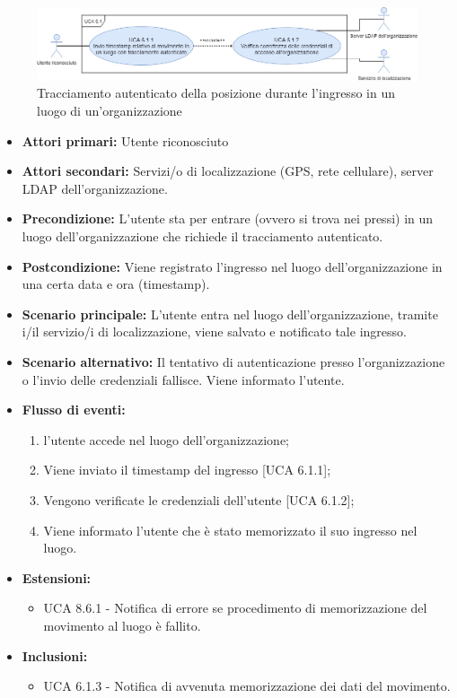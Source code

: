 \begin{figure}[h]
	\centering
	\includegraphics[scale=0.4, center]{sezioni/UseCase/Immagini/UCA6.1.png}
	\caption{Tracciamento autenticato della posizione durante l'ingresso in un luogo di un'organizzazione}
\end{figure}

\begin{itemize}
	\item \textbf{Attori primari:} Utente riconosciuto
	\item \textbf{Attori secondari:} Servizi/o di localizzazione (GPS, rete cellulare), server LDAP dell'organizzazione.
	\item \textbf{Precondizione:} L'utente sta per entrare (ovvero si trova nei pressi) in un luogo dell'organizzazione che richiede il tracciamento autenticato.
	\item \textbf{Postcondizione:} Viene registrato l'ingresso nel luogo dell'organizzazione in una certa data e ora (timestamp).
	\item \textbf{Scenario principale:} L'utente entra nel luogo dell'organizzazione, tramite i/il servizio/i di localizzazione, viene salvato e notificato tale ingresso.
	\item \textbf{Scenario alternativo:} Il tentativo di autenticazione presso l'organizzazione o l'invio delle credenziali fallisce. Viene informato l'utente.
	\item \textbf{Flusso di eventi:}
	\begin{enumerate}
		\item l'utente accede nel luogo dell'organizzazione;
		\item Viene inviato il timestamp  del ingresso [UCA 6.1.1];
		\item Vengono verificate le credenziali dell'utente [UCA 6.1.2];
		\item Viene informato l'utente che è stato memorizzato il suo ingresso nel luogo.
	\end{enumerate}
	\item \textbf{Estensioni:}
	\begin{itemize}
		\item UCA 8.6.1 - Notifica di errore se procedimento di memorizzazione del movimento al luogo è fallito.
	\end{itemize}
	\item \textbf{Inclusioni:}
	\begin{itemize}
		\item UCA 6.1.3 - Notifica di avvenuta memorizzazione dei dati del movimento.
	\end{itemize}
\end{itemize}

